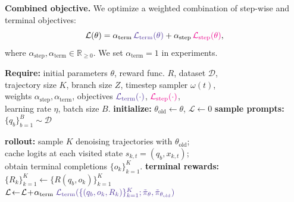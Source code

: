 \documentclass{article}
\theoremstyle{plain}
\theoremstyle{definition}
\theoremstyle{remark}
\begin{document}
\textbf{Combined objective.}
We optimize a weighted combination of step-wise and terminal objectives:
\begin{equation}
  \mathcal{L}(\theta)
  =
  \alpha_{\text{term}}\,\textcolor{Violet}{\mathcal{L}_{\text{term}}(\theta)} 
  + \alpha_{\text{step}}\,\textcolor{Magenta}{\mathcal{L}_{\text{step}}(\theta)},
  \label{eq:total-loss}
\end{equation}
where $\alpha_{\text{step}},\alpha_{\text{term}}\in\mathbb{R}_{\geq 0}$. 
We set $\alpha_{\text{term}}\!=\!1$ in experiments.


\begin{algorithm}[t]
\small
\caption{Diffusion-State Policy Optimization}
\label{alg:dispo}
\begin{algorithmic}[1]
\STATE \textbf{Require:} \!initial parameters $\theta$, reward func. \!$R$, dataset $\mathcal{D}$,\\
trajectory size $K$, branch size $Z$, timestep sampler $\omega(t)$, \\
weights $\alpha_{\mathrm{step}}, \alpha_{\mathrm{term}}$,
objectives $\textcolor{Violet}{\mathcal{L}_{\mathrm{term}}(\cdot)}$, $\textcolor{Magenta}{\mathcal{L}_{\mathrm{step}}(\cdot)}$, \\
learning rate $\eta$, batch size $B$.
\REPEAT
  \STATE \textbf{initialize:} $\theta_{\mathrm{old}} \leftarrow \theta$, $\mathcal{L} \leftarrow 0$
  \STATE \textbf{sample prompts:} $\{q_b\}_{b=1}^B \sim \mathcal{D}$
    \begin{tcolorbox}[colback=Violet!5, colframe=Violet!3, boxrule=-1pt, left=0pt, right=0pt, top=-1pt, bottom=-2pt]
    \STATE \textbf{rollout:} sample $K$ denoising trajectories with $\theta_{\mathrm{old}}$; \\cache logits at each visited state $s_{k,t}\!=\!(q_b,x_{k,t})$; \\obtain terminal completions $\{o_k\}_{k=1}^K$.
    \STATE \textbf{terminal rewards:} $\{R_k\}_{k=1}^K \leftarrow \{R(q_b,o_k)\}_{k=1}^K$
\\
    $\mathcal{L} \!\leftarrow\! \mathcal{L} \!+\! \alpha_{\mathrm{term}}\;\textcolor{Violet}{\mathcal{L}_{\mathrm{term}}(\{(q_b,o_k,R_k)\}_{k=1}^K;\tilde{\pi}_\theta,\tilde{\pi}_{\theta_{\mathrm{old}}})}$
    \end{tcolorbox}


\end{algorithmic}
\end{algorithm}
\end{document}
